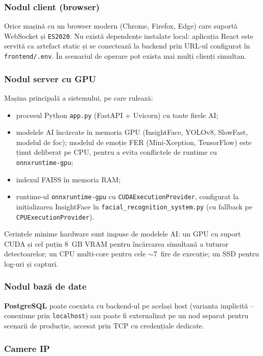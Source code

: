 \documentclass[../../main.tex]{subfiles}
\begin{document}
\subsubsection{Nodul client (browser)}

Orice mașină cu un browser modern (Chrome, Firefox, Edge) care suportă WebSocket și \texttt{ES2020}. Nu există dependențe instalate local: aplicația React este servită ca artefact static și se conectează la backend prin URL-ul configurat în \texttt{frontend/.env}. În scenariul de operare pot exista mai mulți clienți simultan.

\subsubsection{Nodul server cu GPU}

Mașina principală a sistemului, pe care rulează:
\begin{itemize}
    \item procesul Python \texttt{app.py} (FastAPI + Uvicorn) cu toate firele AI;
    \item modelele AI încărcate în memoria GPU (InsightFace, YOLOv8, SlowFast, modelul de foc); modelul de emoție FER (Mini-Xception, TensorFlow) este ținut deliberat pe CPU, pentru a evita conflictele de runtime cu \texttt{onnxruntime-gpu};
    \item indexul FAISS în memoria RAM;
    \item runtime-ul \texttt{onnxruntime-gpu} cu \texttt{CUDAExecutionProvider}, configurat la inițializarea InsightFace în \texttt{facial\_recognition\_system.py} (cu fallback pe \texttt{CPUExecutionProvider}).
\end{itemize}
Cerințele minime hardware sunt impuse de modelele AI: un GPU cu suport CUDA și cel puțin 8~GB VRAM pentru încărcarea simultană a tuturor detectoarelor; un CPU multi-core pentru cele $\sim$7~fire de execuție; un SSD pentru log-uri și capturi.

\subsubsection{Nodul bază de date}

\textbf{PostgreSQL} poate coexista cu backend-ul pe același host (varianta implicită -- conexiune prin \texttt{localhost}) sau poate fi externalizat pe un nod separat pentru scenarii de producție, accesat prin TCP cu credențiale dedicate.

\subsubsection{Camere IP}
\end{document}
